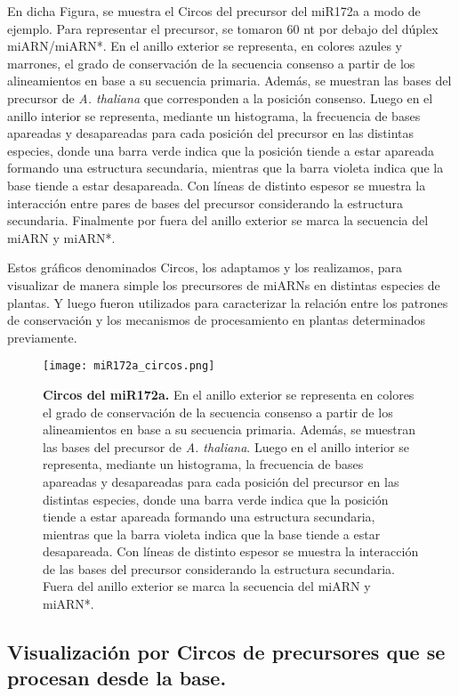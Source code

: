 En dicha Figura, se muestra el Circos del precursor del miR172a a modo de ejemplo.
Para representar el precursor, se tomaron 60 nt por debajo del dúplex miARN/miARN*.
En el anillo exterior se representa, en colores azules y marrones, el grado de conservación de la secuencia consenso a partir de los alineamientos en base a su secuencia primaria.
Además, se muestran las bases del precursor de \textit {A. thaliana} que corresponden a la posición consenso.
Luego en el anillo interior se representa, mediante un histograma, la frecuencia de bases apareadas y desapareadas para cada posición del precursor en las distintas especies, donde una barra verde indica que la posición tiende a estar apareada formando una estructura secundaria, mientras que la barra violeta indica que la base tiende a estar desapareada. 
Con líneas de distinto espesor se muestra la interacción entre pares de bases del precursor considerando la estructura secundaria. 
Finalmente por fuera del anillo exterior se marca la secuencia del miARN y miARN*.

Estos gráficos denominados Circos, los adaptamos y los realizamos, para visualizar de manera simple los precursores de miARNs en distintas especies de plantas.
Y luego fueron utilizados para caracterizar la relación entre los patrones de conservación y los mecanismos de procesamiento en plantas determinados previamente.


\begin{figure}[htbp!] 
    \centering    
    \texttt{[image: miR172a\_circos.png]}
    \caption[Circos del miR172a]{
    \textbf{Circos del miR172a.}
En el anillo exterior se representa en colores el grado de conservación de la secuencia consenso a partir de los alineamientos en base a su secuencia primaria.
Además, se muestran las bases del precursor de \textit {A. thaliana}.
Luego en el anillo interior se representa, mediante un histograma, la frecuencia de bases apareadas y desapareadas para cada posición del precursor en las distintas especies, donde una barra verde indica que la posición tiende a estar apareada formando una estructura secundaria, mientras que la barra violeta indica que la base tiende a estar desapareada. 
Con líneas de distinto espesor se muestra la interacción de las bases del precursor considerando la estructura secundaria. 
Fuera del anillo exterior se marca la secuencia del miARN y miARN*.
   }
     \label{fig:miR172a_circos}
\end{figure}


\subsection{Visualización por Circos de precursores que se procesan desde la base.}

